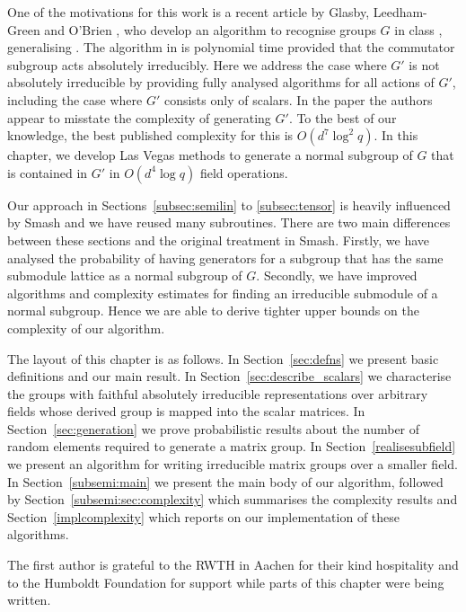 One of the motivations for this work is a 
recent article by Glasby, Leedham-Green and 
O'Brien \cite{GLGOB}, who develop an algorithm 
to recognise  groups $G$ in class ,  
generalising   
\cite{GlasbyHowlett}. The algorithm in \cite{GLGOB} 
is polynomial time provided that the commutator 
subgroup acts absolutely 
irreducibly. Here we address the case where $G'$ 
is not absolutely irreducible by providing fully 
analysed algorithms for all 
actions of $G'$, including the case where $G'$ 
consists only of scalars.  In the paper \cite{GLGOB} 
the authors appear to misstate the complexity of 
generating $G'$. To the best of our knowledge,
the best published complexity for this is 
$O(d^7 \log^2 q)$. In this chapter, we develop Las Vegas methods to generate 
a normal subgroup of $G$ that is contained in $G'$ in $O(d^4 \log q)$ field 
operations. 

Our approach in Sections~\ref{subsec:semilin} 
to \ref{subsec:tensor} is heavily influenced 
by {\sc Smash} \cite{smashnormal} and we have reused 
%
many subroutines. There are two main differences between 
these sections and the original treatment in 
{\sc Smash}. Firstly, we have analysed the probability of having
generators for a subgroup 
that has the same submodule lattice as a normal 
subgroup of $G$. Secondly, we have improved algorithms and 
complexity estimates for finding an irreducible 
submodule of a normal subgroup. Hence we are able to derive 
tighter upper bounds on the complexity
of our algorithm.

The layout of this chapter is as follows. In Section~\ref{sec:defns}
 we present basic definitions and our main result. In 
Section~\ref{sec:describe_scalars} we characterise the groups with 
faithful absolutely irreducible representations over arbitrary fields
 whose derived group 
is mapped into the scalar matrices. In 
Section~\ref{sec:generation} we prove probabilistic results 
about the number of random elements required to generate  a matrix group. 
In Section~\ref{realisesubfield} we present an 
algorithm for writing irreducible matrix groups over a smaller field. 
In Section~\ref{subsemi:main} we present the main body of our algorithm,
followed by Section~\ref{subsemi:sec:complexity} which summarises the complexity 
results and Section~\ref{implcomplexity} which reports on our implementation 
of these algorithms. 

The first author is grateful to the RWTH in Aachen for their kind 
hospitality and to the Humboldt Foundation for support while parts of
this chapter were being written. 

